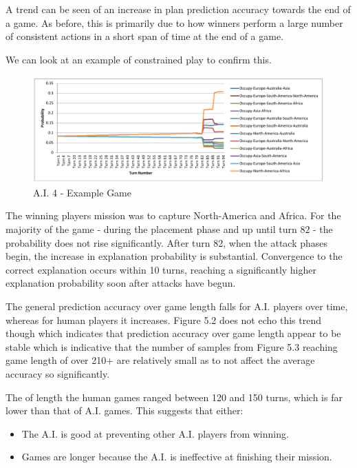 \documentclass[parskip]{cs4rep}
\begin{document}
A trend can be seen of an increase in plan prediction accuracy towards the end of a game. As before, this is primarily due to how winners perform a large number of consistent actions in a short span of time at the end of a game.

We can look at an example of constrained play to confirm this.

\begin{figure}[h]
\centerline{
\includegraphics[width=1.1\textwidth]{images/short-constrained-game.pdf}
}
\caption{A.I. 4 - Example Game}
\label{fig:dom-debug-gui}
\end{figure}

The winning players mission was to capture North-America and Africa. For the majority of the game - during the placement phase and up until turn 82 - the probability does not rise significantly. After turn 82, when the attack phases begin, the increase in explanation probability is substantial. Convergence to the correct explanation occurs within 10 turns, reaching a significantly higher explanation probability soon after attacks have begun.

The general prediction accuracy over game length falls for A.I. players over time, whereas for human players it increases. Figure 5.2 does not echo this trend though which indicates that prediction accuracy over game length appear to be stable which is indicative that the number of samples from Figure 5.3 reaching game length of over 210+ are relatively small as to not affect the average accuracy so significantly.

The of length the human games ranged between 120 and 150 turns, which is far lower than that of A.I. games. This suggests that either:
\begin{itemize}
\item
The A.I. is good at preventing other A.I. players from winning. 
\item
Games are longer because the A.I. is ineffective at finishing their mission.  
\end{itemize}
\end{document}

